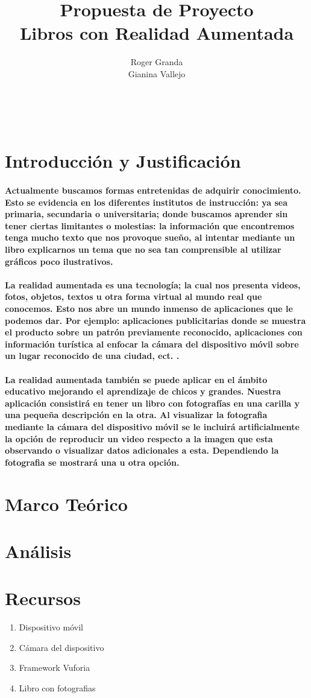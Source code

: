 \documentclass[11pt]{article} %
\title{Propuesta de Proyecto\\Libros con Realidad Aumentada}
\author{Roger Granda\\Gianina Vallejo}
\begin{document}
\maketitle
\

\section{Introducción y Justificación}

\paragraph{
Actualmente buscamos formas entretenidas de adquirir conocimiento.  Esto se evidencia en los diferentes institutos de instrucción: ya sea primaria, secundaria o universitaria; donde buscamos aprender sin tener ciertas limitantes o molestias: la información que encontremos tenga mucho texto que nos provoque sueño, al intentar mediante un libro explicarnos un tema que no sea tan comprensible al utilizar gráficos poco ilustrativos.
 } 


\paragraph{
La realidad aumentada es una tecnología; la cual nos presenta videos, fotos, objetos, textos u otra forma virtual al mundo real que conocemos.  Esto nos abre un mundo inmenso de aplicaciones que le podemos dar.  Por ejemplo: aplicaciones publicitarias donde se muestra el producto sobre un patrón previamente reconocido, aplicaciones con información turística al enfocar la cámara del dispositivo móvil sobre un lugar reconocido de una ciudad, ect. .
 }

\paragraph{
La realidad aumentada también se puede aplicar en el ámbito educativo mejorando el aprendizaje de chicos y grandes.  
Nuestra aplicación consistirá en tener un libro con fotografías en una carilla y una pequeña descripción en la otra.  Al visualizar la fotografia mediante la cámara del dispositivo móvil se le incluirá artificialmente la opción de reproducir un video respecto a la imagen que esta observando o visualizar datos adicionales a esta.  Dependiendo la fotografia se mostrará una u otra opción.
 }

\section{Marco Teórico}


\section{Análisis}


\section{Recursos}
\begin{enumerate} 
	 \item Dispositivo móvil
	 \item Cámara del dispositivo
	 \item Framework Vuforia
	 \item Libro con fotografias
 \end{enumerate}
\end{document}
